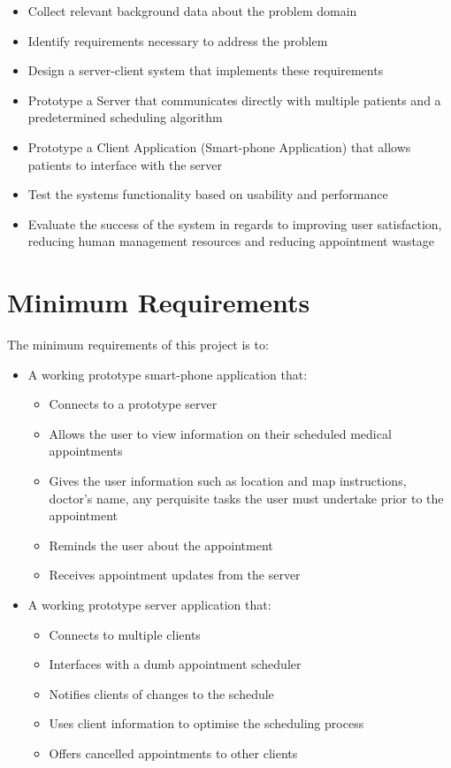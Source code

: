 \begin{itemize}
  \item Collect relevant background data about the problem domain
  \item Identify requirements necessary to address the problem
  \item Design a server-client system that implements these requirements
  \item Prototype a Server that communicates directly with multiple patients and a predetermined scheduling algorithm
  \item Prototype a Client Application (Smart-phone Application) that allows patients to interface with the server
  \item Test the systems functionality based on usability and performance
  \item Evaluate the success of the system in regards to improving user satisfaction, reducing human management resources and reducing appointment wastage
\end{itemize}


\section{Minimum Requirements}

The minimum requirements of this project is to:

\begin{itemize}
	\item A working prototype smart-phone application that:
	\begin{itemize}
		\item Connects to a prototype server
		\item Allows the user to view information on their scheduled medical appointments
		\item Gives the user information such as location and map instructions, doctor's name, any perquisite tasks the user must undertake prior to the appointment
		\item Reminds the user about the appointment
		\item Receives appointment updates from the server
	\end{itemize}
	\item A working prototype server application that:
		\begin{itemize}
			\item Connects to multiple clients
			\item Interfaces with a dumb appointment scheduler
			\item Notifies clients of changes to the schedule
			\item Uses client information to optimise the scheduling process
			\item Offers cancelled appointments to other clients
		\end{itemize}
\end{itemize}


